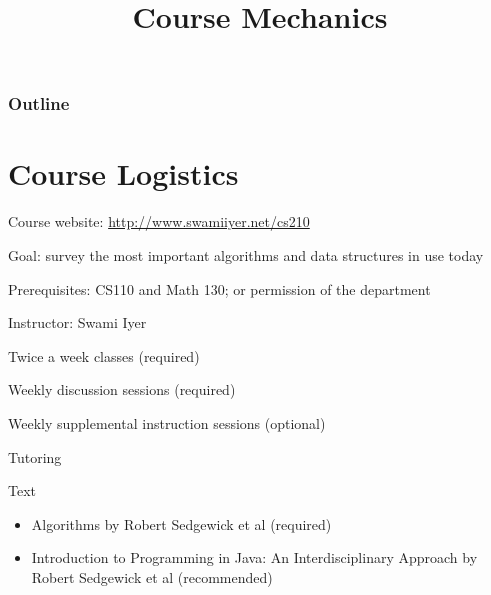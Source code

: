 \documentclass[8pt,a4paper,compress]{beamer}
\title{Course Mechanics}
\date{}
\begin{document}
\begin{frame}
\vfill
\titlepage
\end{frame}

\begin{frame}
\frametitle{Outline}
\tableofcontents
\end{frame}

\section{Course Logistics}
\begin{frame}[fragile]
\pause

Course website: \href{http://www.swamiiyer.net/cs210}{http://www.swamiiyer.net/cs210 \ExternalLink}

\pause
\bigskip

Goal: survey the most important algorithms and data structures in use today

\pause
\bigskip

Prerequisites: CS110 and Math 130; or permission of the department

\pause
\bigskip

Instructor: Swami Iyer

\pause
\bigskip

Twice a week classes (required)

\pause
\bigskip
Weekly discussion sessions (required)

\pause
\bigskip

Weekly supplemental instruction sessions (optional)

\pause
\bigskip

Tutoring

\pause
\bigskip

Text
\begin{itemize}
\item Algorithms by Robert Sedgewick et al (required)
\item Introduction to Programming in Java: An Interdisciplinary Approach  by Robert Sedgewick et al (recommended)
\end{itemize}
\end{frame}
\end{document}
